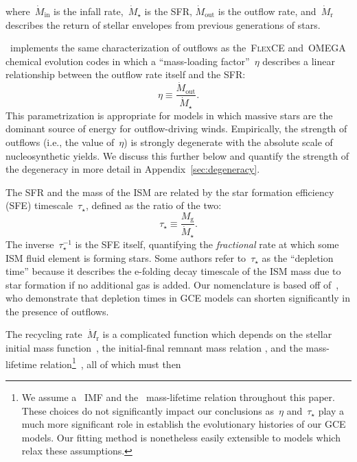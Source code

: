 \documentclass[ms.tex]{subfiles}
\begin{document}
where~$\dot{M}_\text{in}$ is the infall rate,~$\dot{M}_\star$ is the SFR,
$\dot{M}_\text{out}$ is the outflow rate, and~$\dot{M}_\text{r}$ describes
the return of stellar envelopes from previous generations of stars.
\par
\vice~implements the same characterization of outflows as the~\textsc{FlexCE}
\citep{Andrews2017} and~\textsc{OMEGA}~\citep{Cote2017} chemical evolution
codes in which a ``mass-loading factor''~$\eta$ describes a linear relationship
between the outflow rate itself and the SFR:
\begin{equation}
\eta \equiv \frac{\dot{M}_\text{out}}{\dot{M}_\star}.
\label{eq:massloading}
\end{equation}
This parametrization is appropriate for models in which massive stars are the
dominant source of energy for outflow-driving winds.
Empirically, the strength of outflows (i.e., the value of~$\eta$) is strongly
degenerate with the absolute scale of nucleosynthetic yields.
We discuss this further below and quantify the strength of the degeneracy in
more detail in Appendix~\ref{sec:degeneracy}.
\par
The SFR and the mass of the ISM are related by the star formation efficiency
(SFE) timescale~$\tau_\star$, defined as the ratio of the two:
\begin{equation}
\tau_\star \equiv \frac{M_\text{g}}{\dot{M}_\star}.
\label{eq:taustar}
\end{equation}
The inverse~$\tau_\star^{-1}$ is the SFE itself, quantifying the
\textit{fractional} rate at which some ISM fluid element is forming stars.
Some authors refer to~$\tau_\star$ as the ``depletion time''
\citep[e.g.,][]{Tacconi2018} because it describes the e-folding decay timescale
of the ISM mass due to star formation if no additional gas is added.
Our nomenclature is based off of~\citet{Weinberg2017}, who demonstrate that
depletion times in GCE models can shorten significantly in the presence of
outflows.
\par
The recycling rate~$\dot{M}_\text{r}$ is a complicated function which depends
on the stellar initial mass function~\citep[IMF; e.g.,][]{Salpeter1955,
Miller1979, Kroupa2001, Chabrier2003}, the initial-final remnant mass relation
\citep[e.g.,][]{Kalirai2008}, and the mass-lifetime relation\footnote{
	We assume a~\citet{Kroupa2001} IMF and the~\citet{Larson1974} mass-lifetime
	relation throughout this paper.
	These choices do not significantly impact our conclusions as~$\eta$
	and~$\tau_\star$ play a much more significant role in establish the
	evolutionary histories of our GCE models.
	Our fitting method is nonetheless easily extensible to models which relax
	these assumptions.
}~\citep*[e.g.,][]{Larson1974, Maeder1989, Hurley2000}, all of which must then
\end{document}
